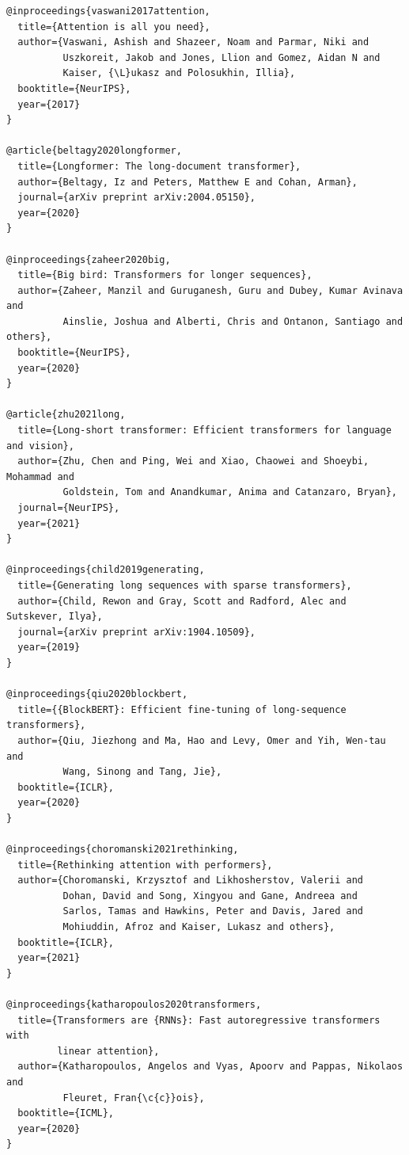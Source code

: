 \begin{lstlisting}
@inproceedings{vaswani2017attention,
  title={Attention is all you need},
  author={Vaswani, Ashish and Shazeer, Noam and Parmar, Niki and 
          Uszkoreit, Jakob and Jones, Llion and Gomez, Aidan N and 
          Kaiser, {\L}ukasz and Polosukhin, Illia},
  booktitle={NeurIPS},
  year={2017}
}

@article{beltagy2020longformer,
  title={Longformer: The long-document transformer},
  author={Beltagy, Iz and Peters, Matthew E and Cohan, Arman},
  journal={arXiv preprint arXiv:2004.05150},
  year={2020}
}

@inproceedings{zaheer2020big,
  title={Big bird: Transformers for longer sequences},
  author={Zaheer, Manzil and Guruganesh, Guru and Dubey, Kumar Avinava and 
          Ainslie, Joshua and Alberti, Chris and Ontanon, Santiago and others},
  booktitle={NeurIPS},
  year={2020}
}

@article{zhu2021long,
  title={Long-short transformer: Efficient transformers for language and vision},
  author={Zhu, Chen and Ping, Wei and Xiao, Chaowei and Shoeybi, Mohammad and 
          Goldstein, Tom and Anandkumar, Anima and Catanzaro, Bryan},
  journal={NeurIPS},
  year={2021}
}

@inproceedings{child2019generating,
  title={Generating long sequences with sparse transformers},
  author={Child, Rewon and Gray, Scott and Radford, Alec and Sutskever, Ilya},
  journal={arXiv preprint arXiv:1904.10509},
  year={2019}
}

@inproceedings{qiu2020blockbert,
  title={{BlockBERT}: Efficient fine-tuning of long-sequence transformers},
  author={Qiu, Jiezhong and Ma, Hao and Levy, Omer and Yih, Wen-tau and 
          Wang, Sinong and Tang, Jie},
  booktitle={ICLR},
  year={2020}
}

@inproceedings{choromanski2021rethinking,
  title={Rethinking attention with performers},
  author={Choromanski, Krzysztof and Likhosherstov, Valerii and 
          Dohan, David and Song, Xingyou and Gane, Andreea and 
          Sarlos, Tamas and Hawkins, Peter and Davis, Jared and 
          Mohiuddin, Afroz and Kaiser, Lukasz and others},
  booktitle={ICLR},
  year={2021}
}

@inproceedings{katharopoulos2020transformers,
  title={Transformers are {RNNs}: Fast autoregressive transformers with 
         linear attention},
  author={Katharopoulos, Angelos and Vyas, Apoorv and Pappas, Nikolaos and 
          Fleuret, Fran{\c{c}}ois},
  booktitle={ICML},
  year={2020}
}


\end{lstlisting}
